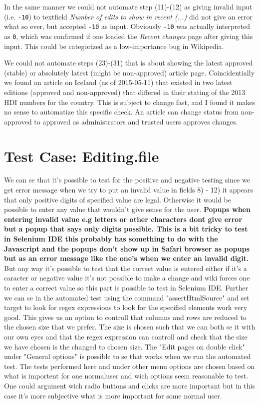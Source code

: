 \documentclass[a4paper,10pt]{article}
\begin{document}
In the same manner we could not automate step (11)-(12) as giving invalid input (i.e. \texttt{-10}) to textfield \textit{Number of edits to show in recent (...)} 
did not give an error what so ever, but accepted \texttt{-10} as input. Obviously \texttt{-10} was actually interpreted as \texttt{0}, which was confirmed if 
one loaded the \textit{Recent changes} page after giving this input. This could be categorized as a low-importance bug in Wikipedia.

We could not automate steps (23)-(31) that is about showing the latest approved (stable) or absolutely latest (might be non-approved) article page. Coincidentially we 
found an article on Iceland (as of 2015-05-11) that existed in two latest editions (approved and non-approved) that differed in their stating of the 2013 HDI numbers for the country. This 
is subject to change fast, and I found it makes no sense to automatize this specific check. An article can change status from non-approved to approved as administrators and 
trusted users approves changes.


\section*{Test Case: Editing.file}

We can se that it’s possible to test for the positive and negative testing since we get error message when we
try to put an invalid value in fields 8) - 12) it appears that only positive digits of specified value are legal. Otherwise
it would be possible to enter any value that wouldn’t give sense for the user. \textbf{\color{red}Popups when entering invalid value e.g letters
or other characters dont give error but a popup that says only digits possible. This is a bit tricky to test in Selenium IDE this
probably has something to do with the Javascript and the popups don't show up in Safari browser as popups but as an error message
like the one's when we enter an invalid digit.} But any way it's possible to test that the correct value is entered either if 
it's a caracter or negative value it's not possible to make a change and wiki forces one to enter a correct value so this part
is possible to test in Selenium IDE. Further we can se in the automated test using the command "assertHtmlSource" and set target
to look for regex expressions to look for the specified elements work very good. This gives us an option to controll that 
columns and rows are reduced to the chosen size that we prefer. The size is chosen such that we can both se it with our own
eyes and that the regex expression can controll and check that the size we have chosen is the changed to chosen size.
The "Edit pages on double click" under "General options" is possible to se that works when we run the automated test.
The tests performed here and under other menu options are chosen based on what is importent for one normaluser and
wich options seem reasonable to test. One could argument wich radio buttons and clicks are more important but in this case
it's more subjective what is more important for some normal user.
\end{document}
